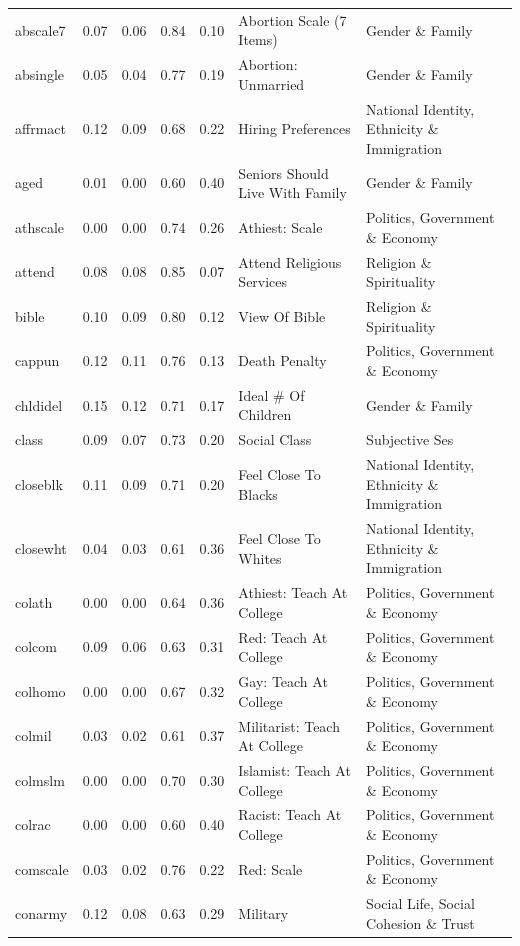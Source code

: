 \documentclass[
  12pt,
]{article}
\begin{document}
\begin{landscape}
\begin{scriptsize}
\begin{longtable}{|p{1.75in}|p{0.3in}|p{0.3in}|p{0.3in}|p{0.3in}|p{2.5in}|p{2.5in}}
abscale7 & 0.07 & 0.06 & 0.84 & 0.10 & Abortion Scale (7 Items) & Gender \& Family \\ 
absingle & 0.05 & 0.04 & 0.77 & 0.19 & Abortion: Unmarried & Gender \& Family \\ 
affrmact & 0.12 & 0.09 & 0.68 & 0.22 & Hiring Preferences & National Identity, Ethnicity \& Immigration \\ 
aged & 0.01 & 0.00 & 0.60 & 0.40 & Seniors Should Live With Family & Gender \& Family \\ 
athscale & 0.00 & 0.00 & 0.74 & 0.26 & Athiest: Scale & Politics, Government \& Economy \\ 
attend & 0.08 & 0.08 & 0.85 & 0.07 & Attend Religious Services & Religion \& Spirituality \\ 
bible & 0.10 & 0.09 & 0.80 & 0.12 & View Of Bible & Religion \& Spirituality \\ 
cappun & 0.12 & 0.11 & 0.76 & 0.13 & Death Penalty & Politics, Government \& Economy \\ 
chldidel & 0.15 & 0.12 & 0.71 & 0.17 & Ideal \# Of Children & Gender \& Family \\ 
class & 0.09 & 0.07 & 0.73 & 0.20 & Social Class & Subjective Ses \\ 
closeblk & 0.11 & 0.09 & 0.71 & 0.20 & Feel Close To Blacks & National Identity, Ethnicity \& Immigration \\ 
closewht & 0.04 & 0.03 & 0.61 & 0.36 & Feel Close To Whites & National Identity, Ethnicity \& Immigration \\ 
colath & 0.00 & 0.00 & 0.64 & 0.36 & Athiest: Teach At College & Politics, Government \& Economy \\ 
colcom & 0.09 & 0.06 & 0.63 & 0.31 & Red: Teach At College & Politics, Government \& Economy \\ 
colhomo & 0.00 & 0.00 & 0.67 & 0.32 & Gay: Teach At College & Politics, Government \& Economy \\ 
colmil & 0.03 & 0.02 & 0.61 & 0.37 & Militarist: Teach At College & Politics, Government \& Economy \\ 
colmslm & 0.00 & 0.00 & 0.70 & 0.30 & Islamist: Teach At College & Politics, Government \& Economy \\ 
colrac & 0.00 & 0.00 & 0.60 & 0.40 & Racist: Teach At College & Politics, Government \& Economy \\ 
comscale & 0.03 & 0.02 & 0.76 & 0.22 & Red: Scale & Politics, Government \& Economy \\ 
conarmy & 0.12 & 0.08 & 0.63 & 0.29 & Military & Social Life, Social Cohesion \& Trust \\ 

\end{longtable}
\end{scriptsize}
\end{landscape}
\end{document}

